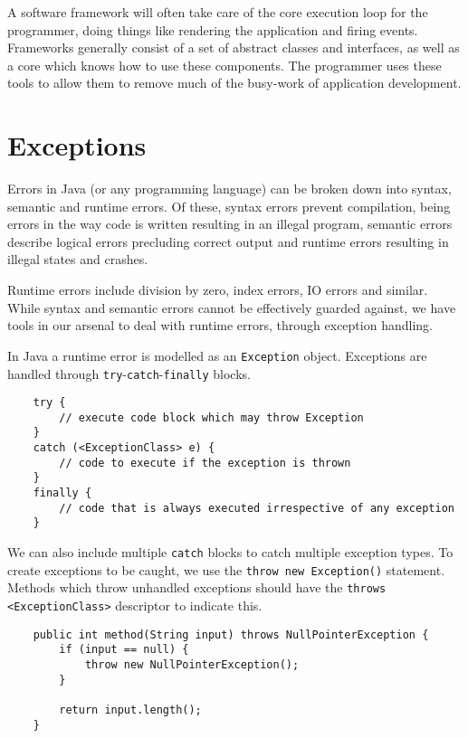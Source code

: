 \documentclass[12pt]{report}
\newcommand{\code}[1]{\lstinline{#1}}
\begin{document}
\begin{flushleft}
A software framework will often take care of the core execution loop for the
programmer, doing things like rendering the application and firing events.
Frameworks generally consist of a set of abstract classes and interfaces, as
well as a core which knows how to use these components. The programmer uses
these tools to allow them to remove much of the busy-work of application
development.

\section*{Exceptions}

Errors in Java (or any programming language) can be broken down into syntax,
semantic and runtime errors. Of these, syntax errors prevent compilation, being
errors in the way code is written resulting in an illegal program, semantic
errors describe logical errors precluding correct output and runtime errors
resulting in illegal states and crashes. \par
Runtime errors include division by zero, index errors, IO errors and similar.
While syntax and semantic errors cannot be effectively guarded against, we have
tools in our arsenal to deal with runtime errors, through exception handling.
\par
In Java a runtime error is modelled as an \code{Exception} object. Exceptions
are handled through \code{try}-\code{catch}-\code{finally} blocks.

\begin{lstlisting}
    try {
        // execute code block which may throw Exception
    }
    catch (<ExceptionClass> e) {
        // code to execute if the exception is thrown
    }
    finally {
        // code that is always executed irrespective of any exception
    }
\end{lstlisting}

We can also include multiple \code{catch} blocks to catch multiple exception
types. To create exceptions to be caught, we use the
\code{throw new Exception()} statement. Methods which throw unhandled
exceptions should have the \code{throws <ExceptionClass>} descriptor to
indicate this.

\begin{lstlisting}
    public int method(String input) throws NullPointerException {
        if (input == null) {
            throw new NullPointerException();
        }

        return input.length();
    }
\end{lstlisting}


\end{flushleft}
\end{document}
